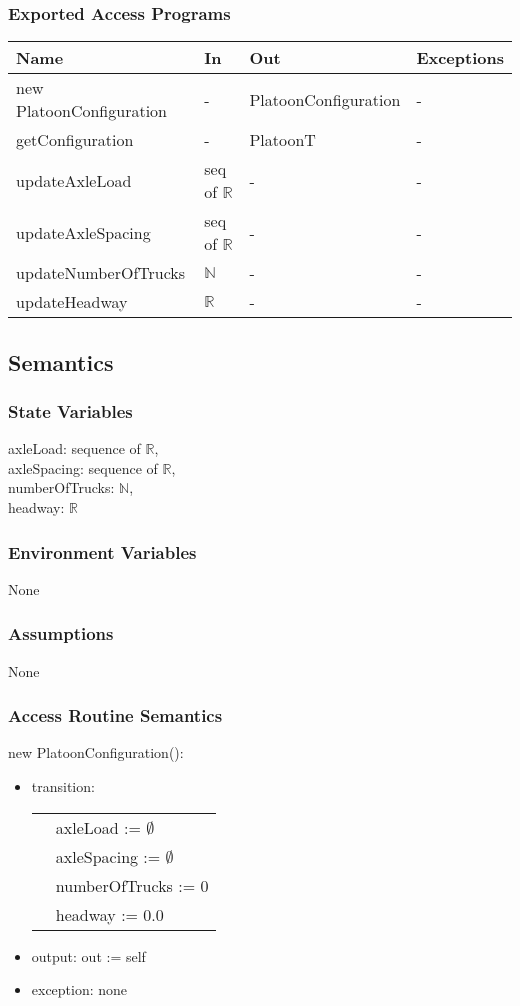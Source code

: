 \documentclass[12pt, titlepage]{article}
\begin{document}
\subsubsection{Exported Access Programs}
\begin{center}
\begin{tabular}{p{5cm} p{2cm} p{4cm} p{5cm}}
\hline
\textbf{Name} & \textbf{In} & \textbf{Out} & \textbf{Exceptions} \\
\hline
new PlatoonConfiguration & - & PlatoonConfiguration & - \\
\hline
getConfiguration & - & PlatoonT & -\\
\hline
updateAxleLoad & seq of $\mathbb{R}$ & - & -\\
\hline
updateAxleSpacing & seq of $\mathbb{R}$ & - & -\\
\hline
updateNumberOfTrucks & $\mathbb{N}$ & - & -\\
\hline
updateHeadway & $\mathbb{R}$	 & - & -\\
\end{tabular}
\end{center}

\subsection{Semantics}

\subsubsection{State Variables}
axleLoad: sequence of $\mathbb{R}$,\\
axleSpacing: sequence of $\mathbb{R}$,\\
numberOfTrucks: $\mathbb{N}$,\\
headway: $\mathbb{R}$
\subsubsection{Environment Variables}
None
\subsubsection{Assumptions}
None
\subsubsection{Access Routine Semantics}

\noindent new PlatoonConfiguration():
\begin{itemize}
\item transition:\\
        \begin{tabular}{p{1cm} p{8cm}}
		& axleLoad := $\emptyset$\\
		& axleSpacing := $\emptyset$\\
		& numberOfTrucks := 0\\
		& headway := 0.0\\
        \end{tabular}
\item output: out := self
\item exception: none
\end{itemize}
\end{document}
